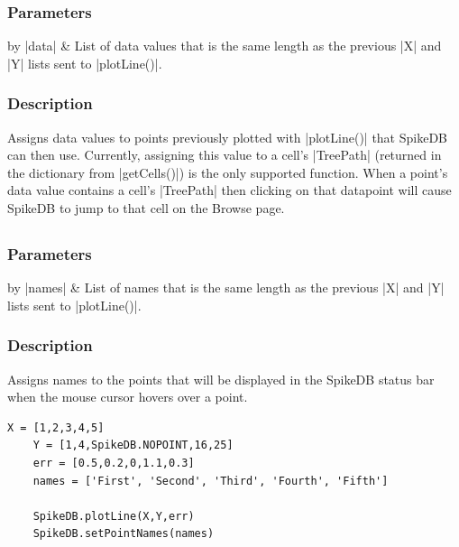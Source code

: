 \documentclass{report}
\begin{document}
\subsubsection{Parameters}
\begin{table}[h]
\begin{center}
\begin{tabular}{by}
		|data| & List of data values that is the same length as the previous |X| and |Y| lists sent to |plotLine()|.\\
	\end{tabular}
\end{center}
\end{table}
\subsubsection{Description}
Assigns data values to points previously plotted with |plotLine()| that SpikeDB can then use. Currently, assigning this value to a cell's |TreePath| (returned in the dictionary from |getCells()|) is the only supported function. When a point's data value contains a cell's |TreePath| then clicking on that datapoint will cause SpikeDB to jump to that cell on the Browse page. 

\clearpage
\subsection[\method{void}{setPointNames}]{}
\subsubsection{Parameters}
\begin{table}[h]
\begin{center}
\begin{tabular}{by}
		|names| & List of names that is the same length as the previous |X| and |Y| lists sent to |plotLine()|.\\
	\end{tabular}
\end{center}
\end{table}
\subsubsection{Description}
Assigns names to the points that will be displayed in the SpikeDB status bar when the mouse cursor hovers over a point.
\begin{lstlisting}[caption=Example]
	X = [1,2,3,4,5]
	Y = [1,4,SpikeDB.NOPOINT,16,25]
	err = [0.5,0.2,0,1.1,0.3]
	names = ['First', 'Second', 'Third', 'Fourth', 'Fifth']

	SpikeDB.plotLine(X,Y,err)
	SpikeDB.setPointNames(names)
\end{lstlisting}
\end{document}
